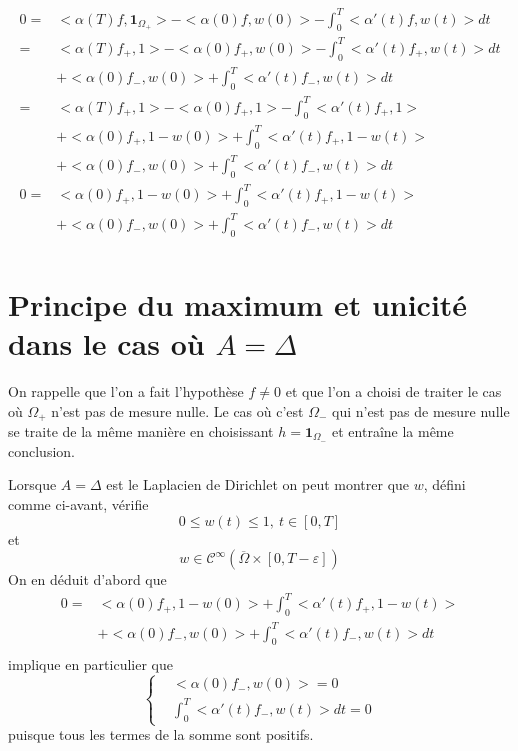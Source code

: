 \documentclass[a4paper]{book}
\begin{document}
\[\begin{aligned}
        0= & <\alpha(T)f,\mathbf{1}_{\Omega_+}> - <\alpha(0)f,w(0)> - \int_{0}^{T}<\alpha'(t)f,w(t)>dt \\
        =  & <\alpha(T)f_+,1> - <\alpha(0)f_+,w(0)>- \int_{0}^{T}<\alpha'(t)f_+,w(t)>dt                \\ &+<\alpha(0)f_-,w(0)>+\int_{0}^{T}<\alpha'(t)f_-,w(t)>dt\\
        =  & <\alpha(T)f_+,1> - <\alpha(0)f_+,1> - \int_{0}^{T}<\alpha'(t)f_+,1>                       \\
           & +<\alpha(0)f_+,1-w(0)> + \int_{0}^{T}<\alpha'(t)f_+,1-w(t)>                               \\
           & +<\alpha(0)f_-,w(0)>+\int_{0}^{T}<\alpha'(t)f_-,w(t)>dt                                   \\
        0= & <\alpha(0)f_+,1-w(0)> + \int_{0}^{T}<\alpha'(t)f_+,1-w(t)>                                \\
           & +<\alpha(0)f_-,w(0)>+\int_{0}^{T}<\alpha'(t)f_-,w(t)>dt                                   \\
    \end{aligned} \]
\section{Principe du maximum et unicité dans le cas où $A=\Delta$}
On rappelle que l'on a fait l'hypothèse $f\neq0$ et que l'on a choisi de traiter le cas où $\Omega_+$ n'est pas de mesure nulle. Le cas où c'est $\Omega_-$ qui n'est pas de mesure nulle se traite de la même manière en choisissant $h=\textbf{1}_{\Omega_-}$ et entraîne la même conclusion.

Lorsque $A=\Delta$ est le Laplacien de Dirichlet on peut montrer que $w$, défini comme ci-avant, vérifie
\[ 0\leq w(t)\leq 1,\ t\in [0,T] \]
et
\[w\in\mathcal{C}^\infty (\overline{\Omega}\times [0,T-\varepsilon])\]
On en déduit d'abord que
\[\begin{aligned}
        0= & <\alpha(0)f_+,1-w(0)> + \int_{0}^{T}<\alpha'(t)f_+,1-w(t)> \\
           & +<\alpha(0)f_-,w(0)>+\int_{0}^{T}<\alpha'(t)f_-,w(t)>dt    \\
    \end{aligned} \]
implique en particulier que
\[\left\lbrace\begin{aligned}
         & <\alpha(0)f_-,w(0)>=0                \\
         & \int_{0}^{T}<\alpha'(t)f_-,w(t)>dt=0
    \end{aligned}\right. \]
puisque tous les termes de la somme sont positifs.
\end{document}
